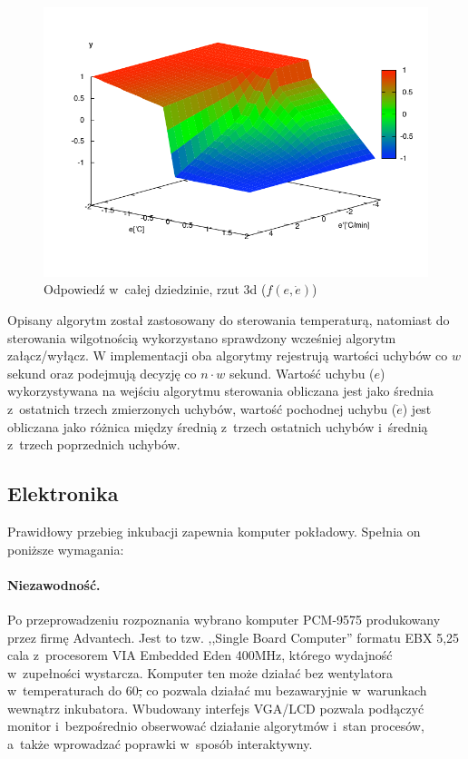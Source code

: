 \begin{figure}[t] 
	\centering\includegraphics[width=16cm]{figures/sterowanie3d}
	\caption{Odpowiedź w~całej dziedzinie, rzut 3d ($f(e, \dot{e})$)}\label{rys:sterowanie3d}
\end{figure}

Opisany algorytm został zastosowany do sterowania temperaturą, natomiast do
sterowania wilgotnością wykorzystano sprawdzony wcześniej algorytm załącz/wyłącz.
W implementacji oba algorytmy rejestrują wartości uchybów co $w$ sekund oraz
podejmują decyzję co $n \cdot w$ sekund. Wartość uchybu ($e$) wykorzystywana na wejściu
algorytmu sterowania obliczana jest jako średnia z~ostatnich trzech zmierzonych
uchybów, wartość pochodnej uchybu ($\dot{e}$) jest obliczana jako różnica między
średnią z~trzech ostatnich uchybów i~średnią z~trzech poprzednich uchybów.

\subsection{Elektronika}
Prawidłowy przebieg inkubacji zapewnia komputer pokładowy. Spełnia on poniższe wymagania:
\paragraph{Niezawodność.} 
Po przeprowadzeniu rozpoznania wybrano komputer PCM-9575 produkowany przez firmę
Advantech. Jest to tzw. ,,Single Board Computer'' formatu EBX 5,25 cala
z~procesorem VIA Embedded Eden 400MHz, którego wydajność w~zupełności wystarcza.
Komputer ten może działać bez wentylatora w~temperaturach do 60\st, co pozwala
działać mu bezawaryjnie w~warunkach wewnątrz inkubatora. Wbudowany interfejs
VGA/LCD pozwala podłączyć monitor i~bezpośrednio obserwować działanie algorytmów
i~stan procesów, a~także wprowadzać poprawki w~sposób interaktywny.

